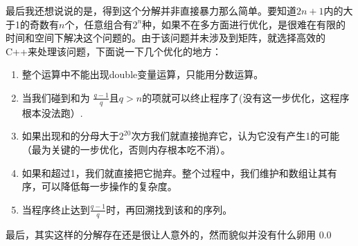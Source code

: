 \documentclass[12pt]{article}
\begin{document}
{最后我还想说说的是，得到这个分解并非直接暴力那么简单。要知道$2n+1$内的大于1的奇数有$n$个，任意组合有$2^n$种，如果不在多方面进行优化，是很难在有限的时间和空间下解决这个问题的。由于该问题并未涉及到矩阵，就选择高效的C++来处理该问题，下面说一下几个优化的地方：
\begin{enumerate}
\item
整个运算中不能出现double变量运算，只能用分数运算。
\item
当我们碰到和为 $\frac{q-1}{q}$且$q>n$的项就可以终止程序了(没有这一步优化，这程序根本没法跑）.
\item
如果出现和的分母大于$2^{20}$次方我们就直接抛弃它，认为它没有产生1的可能（最为关键的一步优化，否则内存根本吃不消）。
\item
如果和超过1，我们就直接把它抛弃。整个过程中，我们维护和数组让其有序，可以降低每一步操作的复杂度。
\item
当程序终止达到$\frac{q-1}{q}$时，再回溯找到该和的序列。
\end{enumerate}

最后，其实这样的分解存在还是很让人意外的，然而貌似并没有什么卵用 0.0

}
\end{document}
